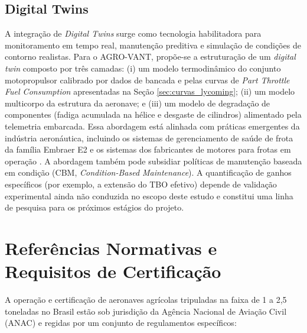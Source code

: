 \documentclass[a4paper,12pt]{article}
\begin{document}
\subsection{Digital Twins}

A integração de \textit{Digital Twins} surge como tecnologia habilitadora para monitoramento em tempo real, manutenção preditiva e simulação de condições de contorno realistas. Para o AGRO-VANT, propõe-se a estruturação de um \textit{digital twin} composto por três camadas: (i) um modelo termodinâmico do conjunto motopropulsor calibrado por dados de bancada e pelas curvas de \textit{Part Throttle Fuel Consumption} apresentadas na Seção \ref{sec:curvas_lycoming}; (ii) um modelo multicorpo da estrutura da aeronave; e (iii) um modelo de degradação de componentes (fadiga acumulada na hélice e desgaste de cilindros) alimentado pela telemetria embarcada. Essa abordagem está alinhada com práticas emergentes da indústria aeronáutica, incluindo os sistemas de gerenciamento de saúde de frota da família Embraer E2 e os sistemas dos fabricantes de motores para frotas em operação \cite{sadeghi2024, airinsight_dt}. A abordagem também pode subsidiar políticas de manutenção baseada em condição (CBM, \textit{Condition-Based Maintenance}). A quantificação de ganhos específicos (por exemplo, a extensão do TBO efetivo) depende de validação experimental ainda não conduzida no escopo deste estudo e constitui uma linha de pesquisa para os próximos estágios do projeto.

\section{Referências Normativas e Requisitos de Certificação}

A operação e certificação de aeronaves agrícolas tripuladas na faixa de 1 a 2{,}5 toneladas no Brasil estão sob jurisdição da Agência Nacional de Aviação Civil (ANAC) e regidas por um conjunto de regulamentos específicos:
\end{document}
